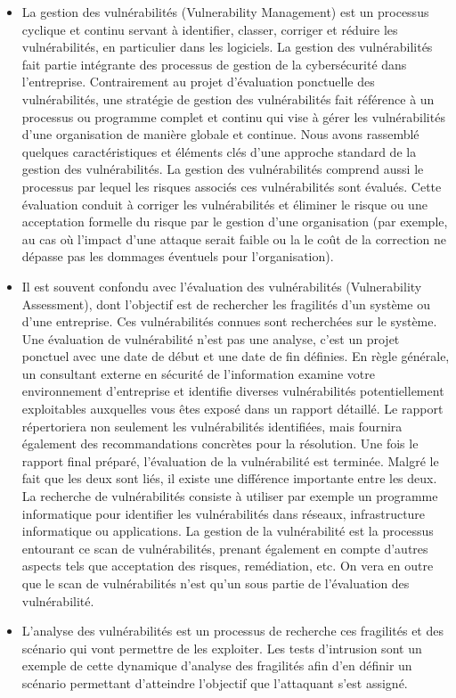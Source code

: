 \begin{itemize}
\item La gestion des vulnérabilités (Vulnerability Management) est un processus cyclique et continu servant à identifier, classer, corriger et réduire les vulnérabilités, en particulier dans les logiciels. La gestion des vulnérabilités fait partie intégrante des processus de gestion de la cybersécurité dans l’entreprise. Contrairement au projet d’évaluation ponctuelle des vulnérabilités, une stratégie de gestion des vulnérabilités fait référence à un processus ou programme complet et continu qui vise à gérer les vulnérabilités d’une organisation de manière globale et continue. Nous avons rassemblé quelques caractéristiques et éléments clés d’une approche standard de la gestion des vulnérabilités.
La gestion des vulnérabilités comprend aussi le processus par lequel  les risques associés ces vulnérabilités sont évalués. Cette évaluation conduit à corriger les vulnérabilités et éliminer le risque ou une acceptation formelle du risque par le gestion d’une organisation (par exemple, au cas où l’impact d’une attaque serait faible ou la le coût de la correction ne dépasse pas les dommages éventuels pour l’organisation).
\item Il est souvent confondu avec l’évaluation des vulnérabilités (Vulnerability Assessment), dont l’objectif est de rechercher les fragilités d’un système ou d’une entreprise. Ces vulnérabilités connues sont recherchées sur le système. Une évaluation de vulnérabilité n'est pas une analyse, c'est un projet ponctuel avec une date de début et une date de fin définies. En règle générale, un consultant externe en sécurité de l'information examine votre environnement d'entreprise et identifie diverses vulnérabilités potentiellement exploitables auxquelles vous êtes exposé dans un rapport détaillé. Le rapport répertoriera non seulement les vulnérabilités identifiées, mais fournira également des recommandations concrètes pour la résolution. Une fois le rapport final préparé, l'évaluation de la vulnérabilité est terminée.
Malgré le fait que les deux sont liés, il existe une différence importante entre les deux. La recherche de vulnérabilités consiste à utiliser par exemple un programme informatique pour identifier les vulnérabilités dans réseaux, infrastructure informatique ou applications. La gestion de la vulnérabilité est la processus entourant ce scan de vulnérabilités, prenant également en compte d’autres aspects tels que acceptation des risques, remédiation, etc. On vera en outre que le scan de vulnérabilités n’est qu’un sous partie de l’évaluation des vulnérabilité.
\item L’analyse des vulnérabilités est un processus de recherche ces fragilités et des scénario qui vont permettre de les exploiter. Les tests d’intrusion sont un exemple de cette dynamique d’analyse des fragilités afin d’en définir un scénario permettant d’atteindre l’objectif que l’attaquant s’est assigné.
\end{itemize}


